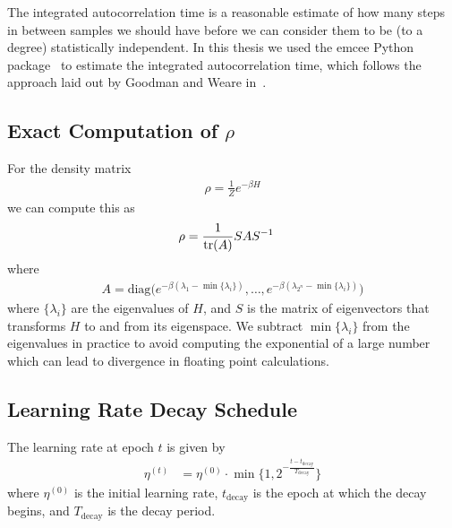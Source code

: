 The integrated autocorrelation time is a reasonable estimate of how many steps in between samples we should have before we can consider them to be (to a degree) statistically independent.
In this thesis we used the emcee Python package~\cite{python_emcee} to estimate the integrated autocorrelation time, which follows the approach laid out by Goodman and Weare in~\cite{goodman_weare_2010}.

\subsection{Exact Computation of \( \rho \)}\label{app:exact_rho_computation}
For the density matrix
\begin{align}
    \rho = \frac{1}{Z} e^{-\beta H}
\end{align}
we can compute this as
\begin{align}
    \rho
        &= \frac{1}{\text{tr}(A)} S A S^{-1}
\end{align}
where
\begin{align}
    A = \text{diag}\Big(e^{-\beta(\lambda_1 - \min\{\lambda_i\})}, \dots, e^{-\beta(\lambda_{2^n} - \min\{\lambda_i\})}\Big)
\end{align}
where \( \{\lambda_i\} \) are the eigenvalues of \( H \), and \( S \) is the matrix of eigenvectors that transforms \( H \) to and from its eigenspace.
We subtract \( \min\{\lambda_i\} \) from the eigenvalues in practice to avoid computing the exponential of a large number which can lead to divergence in floating point calculations.

\subsection{Learning Rate Decay Schedule}\label{app:lr_exp_decay}
The learning rate at epoch \( t \) is given by
\begin{align}
    \eta^{(t)}
        &= \eta^{(0)} \cdot \min\bigg\{1, 2^{-\frac{t - t_\text{decay}}{T_\text{decay}}}\bigg\}
\end{align}
where \( \eta^{(0)} \) is the initial learning rate, \( t_\text{decay} \) is the epoch at which the decay begins, and \( T_\text{decay} \) is the decay period.
